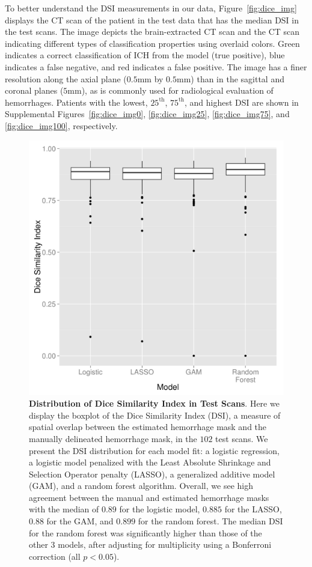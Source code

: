 \documentclass{elsarticle_nonatbib}\usepackage[]{graphicx}\usepackage[]{color}
\begin{document}
To better understand the DSI measurements in our data, Figure~\ref{fig:dice_img} displays the CT scan of the patient in the test data that has the median DSI in the test scans. The image depicts the brain-extracted CT scan and the CT scan indicating different types of classification properties using overlaid colors.  Green indicates a correct classification of ICH from the model (true positive), blue indicates a false negative, and red indicates a false positive.  The image has a finer resolution along the axial plane ($0.5$mm by $0.5$mm) than in the sagittal and coronal planes ($5$mm), as is commonly used for radiological evaluation of hemorrhages.  Patients with the lowest, $25^{\text{th}}$, $75^{\text{th}}$, and highest DSI are shown in Supplemental Figures~\ref{fig:dice_img0}, \ref{fig:dice_img25}, \ref{fig:dice_img75}, and \ref{fig:dice_img100}, respectively.



\begin{figure}
\centering
\includegraphics[width=0.75\linewidth,keepaspectratio]{Reseg_Dice_Comparison.png}
\caption{{\bf Distribution of Dice Similarity Index in Test Scans}.  Here we display the boxplot of the Dice Similarity Index (DSI), a measure of spatial overlap between the estimated hemorrhage mask and the manually delineated hemorrhage mask, in the $102$ test scans.  We present the DSI distribution for each model fit: a logistic regression, a logistic model penalized with the Least Absolute Shrinkage and Selection Operator penalty (LASSO), a generalized additive model (GAM), and a random forest algorithm.  Overall, we see high agreement between the manual and estimated hemorrhage masks with the median of $0.89$ for the logistic model, $0.885$ for the LASSO, $0.88$ for the GAM, and $0.899$ for the random forest. The median DSI for the random forest was significantly higher than those of the other 3 models, after adjusting for multiplicity using a Bonferroni correction (all $p < 0.05$).   }
\label{fig:dice}
\end{figure}
\end{document}
